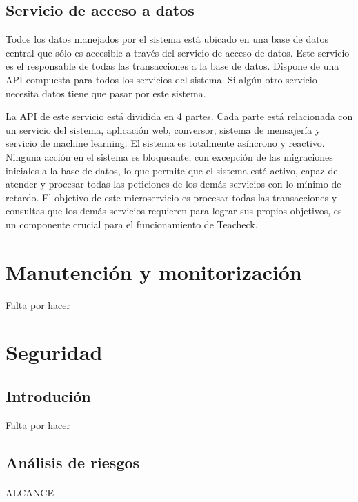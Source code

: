 \subsection{Servicio de acceso a datos}

Todos los datos manejados por el sistema está ubicado en una base de datos central que sólo es accesible a través del servicio de acceso de datos. Este servicio es el responsable de todas las transacciones a la base de datos. Dispone de una API compuesta para todos los servicios del sistema. Si algún otro servicio necesita datos tiene que pasar por este sistema.

La API de este servicio está dividida en 4 partes. Cada parte está relacionada con un servicio del sistema, aplicación web, conversor, sistema de mensajería y servicio de machine learning. El sistema es totalmente asíncrono y reactivo. Ninguna acción en el sistema es bloqueante, con excepción de las migraciones iniciales a la base de datos, lo que permite que el sistema esté activo, capaz de atender y procesar todas las peticiones de los demás servicios con lo mínimo de retardo. El objetivo de este microservicio es procesar todas las transacciones y consultas que los demás servicios requieren para lograr sus propios objetivos, es un componente crucial para el funcionamiento de Teacheck.

\section{Manutención y monitorización}

Falta por hacer

\section{Seguridad}

\subsection{Introdución}

Falta por hacer

\subsection{Análisis de riesgos}

\paragraph{}
ALCANCE

